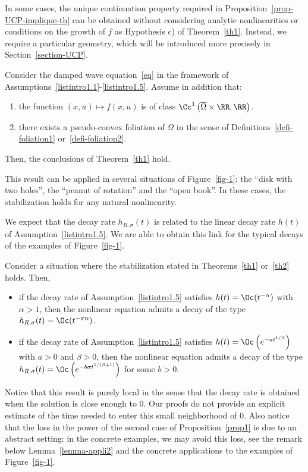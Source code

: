 In some cases, the unique continuation property required in Proposition~\ref{prop-UCP-implique-th} can be obtained without considering analytic nonlinearities or conditions on the growth of $f$ as Hypothesis c) of Theorem~\ref{th1}. Instead, we require a particular geometry, which will be introduced more precisely in Section~\ref{section-UCP}.
\goodbreak

\begin{theo}\label{th2}
Consider the damped wave equation~\eqref{eq} in the framework of Assumptions~\eqref{listintro1.1}-\eqref{listintro1.5}. Assume in addition that:
\begin{enumerate}\alphenumi
\item \label{listtheo1.2.1}the function $(x,u)\mapsto f(x,u)$ is of class $\Cc^1\left(\overline{\Omega}\times \RR,\RR\right)$.
\item \label{listtheo1.2.2}there exists a pseudo-convex foliation of $\Omega$ in the sense of Definitions~\ref{defi-foliation1} or~\ref{defi-foliation2}.
\end{enumerate}
Then, the conclusions of Theorem~\ref{th1} hold.
\end{theo}

This result can be applied in several situations of Figure~\ref{fig-1}: the ``disk with two holes'', the ``peanut of rotation'' and the ``open book''. In these cases, the stabilization holds for any natural nonlinearity.

We expect that the decay rate $h_{R,\sigma}(t)$ is related to the linear decay rate $h(t)$ of Assumption~\eqref{listintro1.5}. We are able to obtain this link for the typical decays of the examples of Figure~\ref{fig-1}.

\begin{prop}\label{prop1}
Consider a situation where the stabilization stated in Theorems~\ref{th1} or~\ref{th2} holds. Then,
\begin{itemize}
\item if the decay rate of Assumption~\eqref{listintro1.5} satisfies $h(t)=\Oc({t^{-\alpha}})$ with $\alpha>1$, then the nonlinear equation admits a decay of the type $h_{R,\sigma}(t)= \Oc (t^{-\sigma\alpha})$.
\item if the decay rate of Assumption~\eqref{listintro1.5} satisfies $h(t)=\Oc \left(e^{-a {t^{1/\beta}}}\right)$ with $a>0$ and $\beta>0$, then the nonlinear equation admits a decay of the type $h_{R,\sigma}(t)\linebreak= \Oc \left(e^{-b\sigma t^{1/(\beta+1)}}\right)$ for some $b>0$.
\end{itemize}
\end{prop}

Notice that this result is purely local in the sense that the decay rate is obtained when the solution is close enough to $0$. Our proofs do not provide an explicit estimate of the time needed to enter this small neighborhood of $0$. Also notice that the loss in the power of the second case of Proposition~\ref{prop1} is due to an abstract setting: in the concrete examples, we may avoid this loss, see the remark below Lemma~\ref{lemma-appli2} and the concrete applications to the examples of Figure~\ref{fig-1}.

